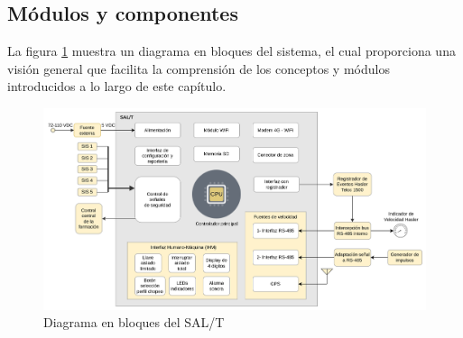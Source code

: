 \subsection{Módulos y componentes}

La figura \ref{fig:diagrama_bloques} muestra un diagrama en bloques del sistema, el cual proporciona una visión general que facilita la comprensión de los conceptos y módulos introducidos a lo largo de este capítulo.

\begin{figure}[H]
    \centering
    \includegraphics[width=\linewidth]{img/diagrama_bloques.png}
    \caption{Diagrama en bloques del SAL/T}
    \label{fig:diagrama_bloques}
\end{figure}
